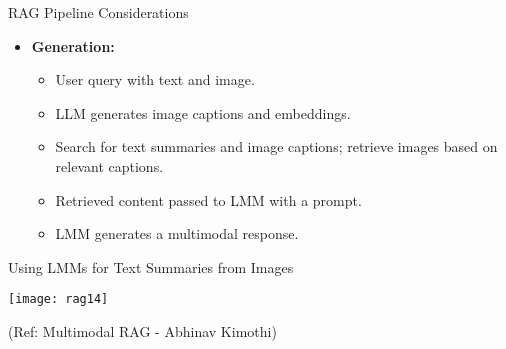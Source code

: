 \begin{frame}[fragile]{RAG Pipeline Considerations}
\begin{itemize}
        \item \textbf{Generation:}
            \begin{itemize}
                \item User query with text and image.
                \item LLM generates image captions and embeddings.
                \item Search for text summaries and image captions; retrieve images based on relevant captions.
                \item Retrieved content passed to LMM with a prompt.
                \item LMM generates a multimodal response.
            \end{itemize}
    \end{itemize}
\end{frame}

\begin{frame}[fragile]{Using LMMs for Text Summaries from Images}


		\begin{center}
		\texttt{[image: rag14]}
		\end{center}

{\tiny (Ref: Multimodal RAG - Abhinav  Kimothi)}

\end{frame}
